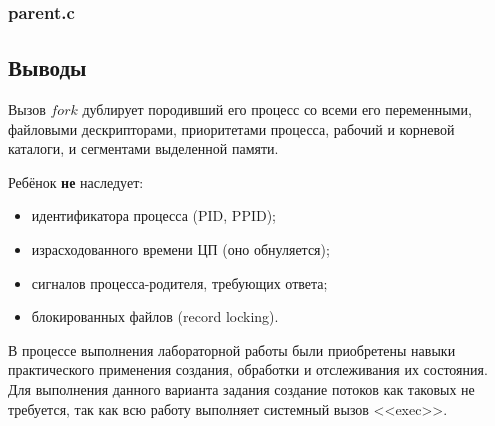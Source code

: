 \documentclass[12pt]{article}
\begin{document}
	
	
	\subsubsection*{parent.c}
	
	
	
	\subsection*{Выводы}
	
	Вызов $fork$ дублирует породивший его процесс со всеми его переменными, файловыми дескрипторами, приоритетами процесса, рабочий и корневой каталоги, и сегментами выделенной памяти.
	
	Ребёнок {\bf не} наследует:
	\begin{itemize}
		\item идентификатора процесса (PID, PPID);
		\item израсходованного времени ЦП (оно обнуляется);
		\item сигналов процесса-родителя, требующих ответа;
		\item блокированных файлов (record locking).
	\end{itemize}
	
	В процессе выполнения лабораторной работы были приобретены навыки практического применения создания, обработки и отслеживания их состояния. Для выполнения данного варианта задания создание потоков как таковых не требуется, так как всю работу выполняет системный вызов <<exec>>.
	
\end{document}
